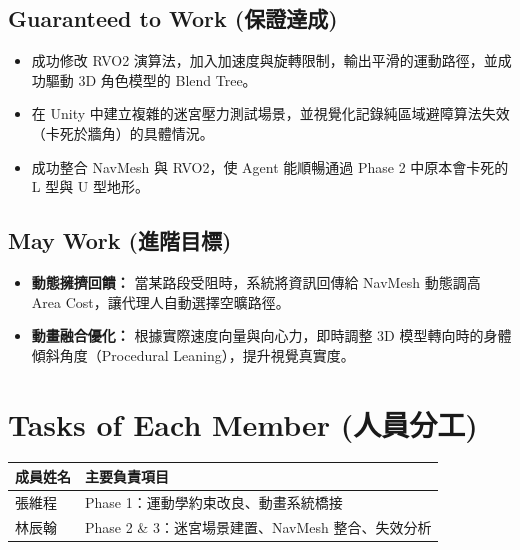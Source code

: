 \documentclass[11pt, a4paper]{article}
\begin{document}
\subsection{Guaranteed to Work (保證達成)}
\begin{itemize}
    \item 成功修改 RVO2 演算法，加入加速度與旋轉限制，輸出平滑的運動路徑，並成功驅動 3D 角色模型的 Blend Tree。
    \item 在 Unity 中建立複雜的迷宮壓力測試場景，並視覺化記錄純區域避障算法失效（卡死於牆角）的具體情況。
    \item 成功整合 NavMesh 與 RVO2，使 Agent 能順暢通過 Phase 2 中原本會卡死的 L 型與 U 型地形。
\end{itemize}

\subsection{May Work (進階目標)}
\begin{itemize}
    \item \textbf{動態擁擠回饋：} 當某路段受阻時，系統將資訊回傳給 NavMesh 動態調高 Area Cost，讓代理人自動選擇空曠路徑。
    \item \textbf{動畫融合優化：} 根據實際速度向量與向心力，即時調整 3D 模型轉向時的身體傾斜角度（Procedural Leaning），提升視覺真實度。
\end{itemize}

\section{Tasks of Each Member (人員分工)}
\begin{center}
\begin{tabular}{ll}
\toprule
\textbf{成員姓名} & \textbf{主要負責項目} \\
\midrule
張維程 & Phase 1：運動學約束改良、動畫系統橋接 \\
林辰翰 & Phase 2 \& 3：迷宮場景建置、NavMesh 整合、失效分析 \\
\bottomrule
\end{tabular}
\end{center}
\end{document}
